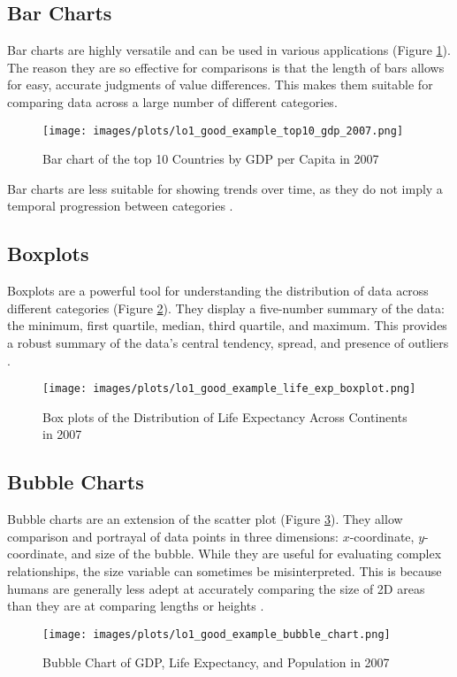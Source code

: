 \subsection{Bar Charts}

Bar charts are highly versatile and can be used in various applications (Figure \ref{fig:bar_chart_good}). The reason they are so effective for comparisons is that the length of bars allows for easy, accurate judgments of value differences. This makes them suitable for comparing data across a large number of different categories.

\begin{figure}[h]
    \centering
    \texttt{[image: images/plots/lo1\_good\_example\_top10\_gdp\_2007.png]} 
    \caption{Bar chart of the top 10 Countries by GDP per Capita in 2007}
    \label{fig:bar_chart_good}
\end{figure}

Bar charts are less suitable for showing trends over time, as they do not imply a temporal progression between categories \cite{heerTourVisualizationZoo2010}.

\subsection{Boxplots}

Boxplots are a powerful tool for understanding the distribution of data across different categories (Figure \ref{fig:boxplot_good}). They display a five-number summary of the data: the minimum, first quartile, median, third quartile, and maximum. This provides a robust summary of the data's central tendency, spread, and presence of outliers \cite{tukeyExploratoryDataAnalysis1977}.

\begin{figure}[h]
    \centering
    \texttt{[image: images/plots/lo1\_good\_example\_life\_exp\_boxplot.png]} 
    \caption{Box plots of the Distribution of Life Expectancy Across Continents in 2007}
    \label{fig:boxplot_good}
\end{figure}

\subsection{Bubble Charts}

Bubble charts are an extension of the scatter plot (Figure \ref{fig:bubble_chart_good}). They allow comparison and portrayal of data points in three dimensions: $x$-coordinate, $y$-coordinate, and size of the bubble. While they are useful for evaluating complex relationships, the size variable can sometimes be misinterpreted. This is because humans are generally less adept at accurately comparing the size of 2D areas than they are at comparing lengths or heights \cite{clevelandGraphicalPerceptionTheory1984}.

\begin{figure}[h]
    \centering
    \texttt{[image: images/plots/lo1\_good\_example\_bubble\_chart.png]} 
    \caption{Bubble Chart of GDP, Life Expectancy, and Population in 2007}
    \label{fig:bubble_chart_good}
\end{figure}